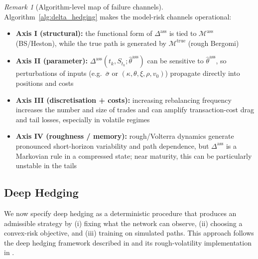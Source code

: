 \documentclass[12pt,a4paper]{article}
\theoremstyle{definition}
\theoremstyle{plain}
\theoremstyle{remark}
\newtheorem{remark}{Remark}[section]
\theoremstyle{plain}
\begin{document}
\begin{remark}[Algorithm-level map of failure channels]
\label{rem:delta_failure_map}
Algorithm~\ref{alg:delta_hedging} makes the model-risk channels operational:

\begin{itemize}
\item \textbf{Axis I (structural):} the functional form of $\Delta^{\mathrm{ass}}$ is tied to $\mathcal{M}^{\mathrm{ass}}$ (BS/Heston),
while the true path is generated by $\mathcal{M}^{\mathrm{true}}$ (rough Bergomi) \cite{GatheralRough,BayerFriz2016,BlackScholes1973,Heston1993}

\item \textbf{Axis II (parameter):} $\Delta^{\mathrm{ass}}(t_k,S_{t_k};\hat\theta^{\mathrm{ass}})$ can be sensitive to $\hat\theta^{\mathrm{ass}}$,
so perturbations of inputs (e.g.\ $\bar\sigma$ or $(\kappa,\theta,\xi,\rho,v_0)$) propagate directly into positions and costs \cite{ElKaroui1998Robustness}

\item \textbf{Axis III (discretisation + costs):} increasing rebalancing frequency increases the number and size of trades
and can amplify transaction-cost drag and tail losses, especially in volatile regimes \cite{WhalleyWilmott2002,Buehler2019DeepHedging}

\item \textbf{Axis IV (roughness / memory):} rough/Volterra dynamics generate pronounced short-horizon variability and path dependence,
but $\Delta^{\mathrm{ass}}$ is a Markovian rule in a compressed state; near maturity, this can be particularly unstable in the tails \cite{GatheralRough,BayerFriz2016}
\end{itemize}
\end{remark}

\subsection{Deep Hedging}
\label{subsec:deep_hedging_framework}

\noindent
We now specify deep hedging as a deterministic procedure that produces an admissible strategy
by (i) fixing what the network can observe, (ii) choosing a convex-risk objective, and (iii) training on simulated paths.
This approach follows the deep hedging framework described in \cite{Buehler2019DeepHedging} and its rough-volatility implementation in \cite{Horvath2021DeepRough} \cite{Buehler2019DeepHedging,Horvath2021DeepRough}.
\end{document}
